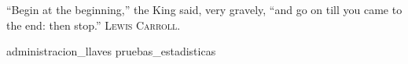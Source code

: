 %
%
%

\newpage
{}
{}
{
  \epigrafe
  {%
    ``Begin at the beginning,'' the King said, very gravely, ``and go on till
    you came to the end: then stop.''%
  }
  {%
    \textsc{Lewis Carroll}.%
  }
}

\begin{appendices}
  {administracion_llaves}
  {pruebas_estadisticas}
\end{appendices}

\newpage
